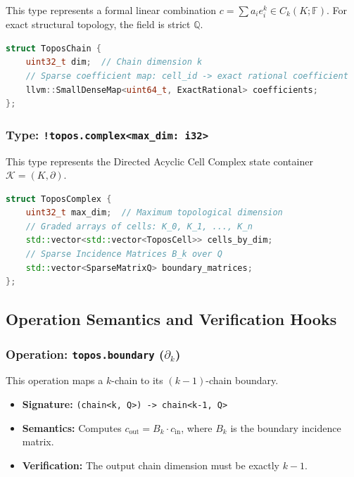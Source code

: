 \documentclass[manuscript, nonacm, review=false]{acmart}
\theoremstyle{definition}
\theoremstyle{plain}
\newcommand{\Q}{\mathbb{Q}}
\newcommand{\K}{\mathcal{K}}
\newcommand{\F}{\mathbb{F}}
\begin{document}
This type represents a formal linear combination $c = \sum a_i e_i^k \in C_k(K; \F)$. For exact structural topology, the field is strict $\Q$.

\begin{lstlisting}[language=C++, caption={Memory layout for \texttt{ToposChain}}, label={lst:chain_layout}]
struct ToposChain {
    uint32_t dim;  // Chain dimension k
    // Sparse coefficient map: cell_id -> exact rational coefficient
    llvm::SmallDenseMap<uint64_t, ExactRational> coefficients;
};
\end{lstlisting}

\subsubsection{Type: \texttt{!topos.complex<max\_dim: i32>}}

This type represents the Directed Acyclic Cell Complex state container $\K = (K, \partial)$.

\begin{lstlisting}[language=C++, caption={Memory layout for \texttt{ToposComplex}}, label={lst:complex_layout}]
struct ToposComplex {
    uint32_t max_dim;  // Maximum topological dimension
    // Graded arrays of cells: K_0, K_1, ..., K_n
    std::vector<std::vector<ToposCell>> cells_by_dim;
    // Sparse Incidence Matrices B_k over Q
    std::vector<SparseMatrixQ> boundary_matrices;
};
\end{lstlisting}


\subsection{Operation Semantics and Verification Hooks}
\label{subsec:ir_ops}

\subsubsection{Operation: \texttt{topos.boundary} ($\partial_k$)}

This operation maps a $k$-chain to its $(k-1)$-chain boundary.

\begin{itemize}
    \item \textbf{Signature:} \texttt{(chain<k, Q>) -> chain<k-1, Q>}
    \item \textbf{Semantics:} Computes $c_{\text{out}} = B_k \cdot c_{\text{in}}$, where $B_k$ is the boundary incidence matrix.
    \item \textbf{Verification:} The output chain dimension must be exactly $k-1$.
\end{itemize}
\end{document}
